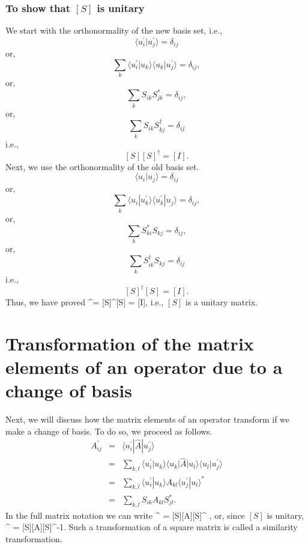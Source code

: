 \subsubsection{To show that $[S]$ is unitary}

We start with the orthonormality of the new basis set, i.e., 
\[ \langle u_i^{\prime}|u_j^{\prime}\rangle = \delta_{ij} \]
or,
\[ \sum_k \langle u_i^{\prime}|u_k\rangle \langle u_k|u_j^{\prime}\rangle =\delta_{ij}, \]
or,
\[ \sum_k S_{ik}S_{jk}^* = \delta_{ij}, \]
or,
\[ \sum_{k} S_{ik}S^{\dag}_{kj} =\delta_{ij} \]
i.e.,
\[ [S][S]^{\dag} = [I].\]
Next, we use the orthonormality of the old basis set.
\[ \langle u_i|u_j\rangle = \delta_{ij} \]
or,
\[ \sum_k \langle u_i|u_k^{\prime}\rangle \langle u_k^{\prime}|u_j\rangle =\delta_{ij}, \]
or,
\[ \sum_k S^*_{ki}S_{kj} = \delta_{ij}, \]
or,
\[ \sum_{k} S^{\dag}_{ik}S_{kj} =\delta_{ij} \]
i.e.,
\[ [S]^{\dag}[S] = [I].\]
Thus, we have proved
\be
[S][S]^{\dag}= [S]^{\dag}[S] = [I],
\ee
i.e.,
$[S]$ is a unitary matrix.



\section{Transformation of the matrix elements of an operator due to a change of basis}
Next, we will discuss how the matrix elements of an operator transform if we make a change of basis. To do so, we proceed as follows.
\begin{eqnarray}
A^{\prime}_{ij} &=& \langle u_i^{\prime}|\hat{A}|u_j^{\prime}\rangle \nonumber \\
&=& \sum_{k,l} \langle u_i^{\prime}|u_k\rangle \langle u_k|\hat{A}|u_l\rangle \langle u_l|u_j^{\prime}\rangle \nonumber \\
&=& \sum_{k,l} \langle u_i^{\prime}|u_k\rangle A_{kl} \langle u_j^{\prime}|u_l\rangle^* \nonumber \\
&=& \sum_{k,l} S_{ik}A_{kl}S_{jl}^* .
\end{eqnarray} 
In the full matrix notation we can write
\be
[A]^{\prime} = [S][A][S]^{\dag} , 
\ee
or, since $[S]$ is unitary,
\be
[A]^{\prime} = [S][A][S]^{-1}.
\ee
Such a transformation of a square matrix is called a similarity transformation.



